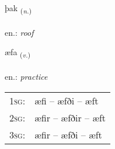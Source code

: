 \documentclass[frontgrid, backgrid]{flacards}\usepackage[]{graphicx}\usepackage[]{xcolor}
\begin{document}
{þak \small{\textsubscript{(\textit{n.})}} \\[1ex] %
\textphonetic{[θaːk]} \\
en.: \emph{roof} \\  [2ex]
\renewcommand*{\arraystretch}{0.8}
}

\renewcommand{\flhead}{\vskip5pt \fboxsep=0pt {\small\bfseries\footnotesize Sagnorð | Verb}}
\renewcommand{\fcfoot}{\vskip5pt \fboxsep=0pt \hspace{2pt}{\small\bfseries\footnotesize 2K}}

\renewcommand{\blhead}{\vskip5pt {\small\bfseries\footnotesize Sagnorð | Verb }}
\renewcommand{\bcfoot}{\vskip5pt \hspace{2pt}{\small\bfseries\footnotesize 2K}}


{æfa \small{\textsubscript{(\textit{v.})}} \\[1ex] %
\textphonetic{[aiːva]} \\
en.: \emph{practice} \\  [2ex]
\renewcommand*{\arraystretch}{0.8}
\begin{tabular}{p{1cm}l}
\textsc{1sg}: & æfi -- æfði -- æft \\ 
\textsc{2sg}: & æfir -- æfðir -- æft \\ 
\textsc{3sg}: & æfir -- æfði -- æft \\ 
\end{tabular}
}

\renewcommand{\flhead}{\vskip5pt \fboxsep=0pt {\small\bfseries\footnotesize Nafnorð | Noun}}
\renewcommand{\fcfoot}{\vskip5pt \fboxsep=0pt \hspace{2pt}{\small\bfseries\footnotesize 2K}}

\renewcommand{\blhead}{\vskip5pt {\small\bfseries\footnotesize Nafnorð | Noun }}
\renewcommand{\bcfoot}{\vskip5pt \hspace{2pt}{\small\bfseries\footnotesize 2K}}
\end{document}
